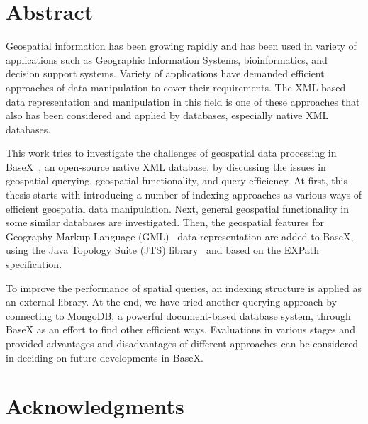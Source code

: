 \documentclass[a4paper,12pt]{article}
\begin{document}
\renewcommand{\lstlistingname}{Code}

\thispagestyle{empty}
\newpage
\newpage
\section*{Abstract}
Geospatial information has been growing rapidly and has been used in variety of applications 
such as Geographic Information Systems, bioinformatics, and decision support systems. 
Variety of applications have demanded efficient approaches of data manipulation to cover their requirements. 
The XML-based data representation and manipulation in this field is one of these approaches that also has been considered and applied by databases, especially native XML databases. 

This work tries to investigate the challenges of geospatial data processing in BaseX~\cite{www/basex}, an open-source native XML database, by discussing the issues in geo\-spatial querying, geospatial functionality, and query efficiency. 
At first, this thesis starts with introducing a number of indexing approaches as various ways of efficient geospatial data manipulation. 
Next, general geospatial functionality in some similar databases are investigated. 
Then, the geospatial features for Geography Markup Language (GML)~\cite{gml} data representation are added to BaseX, 
using the Java Topology Suite (JTS) library~\cite{jts} and based on the EXPath specification.

To improve the performance of spatial queries, an indexing structure is applied as an external library.
At the end, we have tried another querying approach by connecting to MongoDB, a powerful document-based database system, through BaseX as an effort to find other efficient ways.
Evaluations in various stages and provided advantages and disadvantages of different approaches can be considered in deciding on future developments in BaseX.
\thispagestyle{empty}

\newpage
\section*{Acknowledgments}
\thispagestyle{empty}
\end{document}
